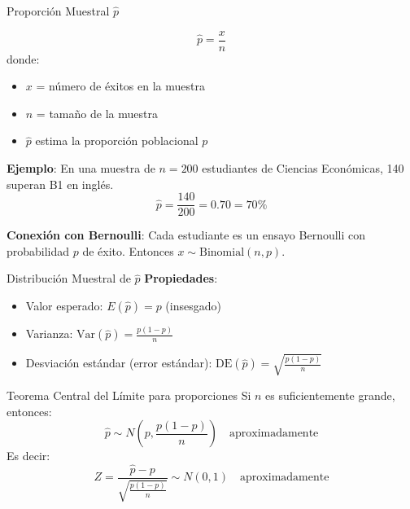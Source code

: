 \documentclass[aspectratio=169, 11pt]{beamer}
\begin{document}
\begin{frame}{Proporción Muestral $\hat{p}$}
\begin{definition}
\[
\hat{p} = \frac{x}{n}
\]
donde:
\begin{itemize}
  \item $x$ = número de éxitos en la muestra
  \item $n$ = tamaño de la muestra
  \item $\hat{p}$ estima la proporción poblacional $p$
\end{itemize}
\end{definition}

\textbf{Ejemplo}: En una muestra de $n = 200$ estudiantes de Ciencias Econ\'omicas, 140 superan B1 en inglés.
\[
\hat{p} = \frac{140}{200} = 0.70 = 70\%
\]

{\small\textbf{Conexión con Bernoulli}: Cada estudiante es un ensayo Bernoulli con probabilidad $p$ de éxito. Entonces $x \sim \text{Binomial}(n, p)$.}
\end{frame}

\begin{frame}{Distribución Muestral de $\hat{p}$}
\textbf{Propiedades}:
\begin{itemize}
  \item Valor esperado: $E(\hat{p}) = p$ (insesgado)
  \item Varianza: $\text{Var}(\hat{p}) = \frac{p(1-p)}{n}$
  \item Desviación estándar (error estándar): $\text{DE}(\hat{p}) = \sqrt{\frac{p(1-p)}{n}}$
\end{itemize}

\vspace{0.2cm}
\begin{block}{Teorema Central del Límite para proporciones}
Si $n$ es suficientemente grande, entonces:
\[
\hat{p} \sim N\left(p, \frac{p(1-p)}{n}\right) \quad \text{aproximadamente}
\]
Es decir:
\[
Z = \frac{\hat{p} - p}{\sqrt{\frac{p(1-p)}{n}}} \sim N(0,1) \quad \text{aproximadamente}
\]
\end{block}
\end{frame}
\end{document}
